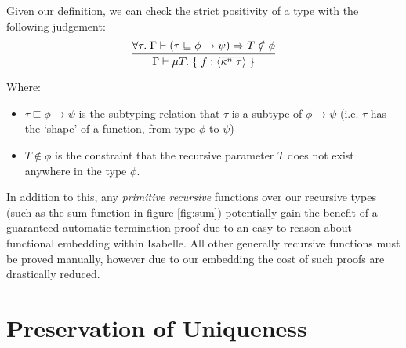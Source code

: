 Given our definition, we can check the strict positivity of a type with the following judgement:
$$
\infer{
    \Gamma \vdash \mu T.\; \{\; f: \langle \overline{\kappa^n\; \tau} \rangle\; \}
}{
   \forall \tau.\; \Gamma \vdash (\tau \sqsubseteq \phi \rightarrow \psi) \implies T \notin \phi
}
$$

Where:
\begin{itemize}
    \item 
        $\tau \sqsubseteq \phi \rightarrow \psi$ is the subtyping relation that $\tau$ 
        is a subtype of $\phi \rightarrow \psi$ 
        (i.e. $\tau$ has the `shape' of a function, from type $\phi$ to $\psi$) 
    \item
        $T \notin \phi$ is the constraint that the recursive parameter $T$ 
        does not exist anywhere in the type $\phi$.
\end{itemize}

In addition to this, any \textit{primitive recursive} functions over our recursive types 
(such as the sum function in figure \ref{fig:sum}) potentially gain the benefit of a guaranteed
automatic termination proof due to an easy to reason about functional embedding within Isabelle.
All other generally recursive functions must be proved manually, however due to our embedding
the cost of such proofs are drastically reduced.


\section{Preservation of Uniqueness}

